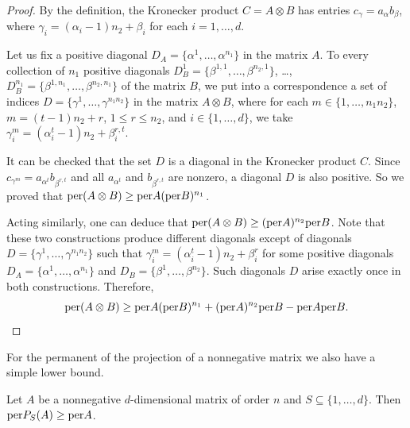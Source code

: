 \documentclass[a4paper]{article}
\begin{document}
\begin{proof}
By the definition, the Kronecker product $C = A \otimes B$ has entries $c_{\gamma} = a_{\alpha} b_{\beta}$, where $\gamma_i = (\alpha_i -1)n_2 + \beta_i$ for each $i = 1, \ldots, d$.  

Let  us fix a positive diagonal $D_A = \{ \alpha^1, \ldots, \alpha^{n_1}\}$ in the matrix $A$. To every collection of $n_1$ positive diagonals $D^1_B = \{ \beta^{1,1},\ldots,  \beta^{n_2,1} \}$, \ldots, $D^{n_1}_B = \{ \beta^{1,n_1}, \ldots, \beta^{n_2,n_1} \}$ of the matrix $B$,  we put into a correspondence a set of indices $D = \{ \gamma^1, \ldots, \gamma^{n_1 n_2} \}$ in the matrix $A \otimes B$, where for each $m \in \{ 1, \ldots, n_1n_2\}$, $m = (t- 1) n_2 + r$, $1 \leq r \leq n_2$, and $i \in \{ 1, \ldots, d\} $, we take  $\gamma^m_i = (\alpha^{t}_i -1)n_2 + \beta^{r,t}_i $.

It can be checked that the set $D$ is a diagonal in the Kronecker product $C$.
Since  $c_{\gamma^m} = a_{\alpha^t} b_{\beta^{r,t}}$ and all $a_{\alpha^t}$ and $b_{\beta^{r,t}}$ are nonzero, a diagonal $D$ is also positive. So we proved that ${\rm per} (A \otimes B) \geq {\rm per} A ({\rm per} B)^{n_1}$.

Acting similarly, one can deduce that ${\rm per} (A \otimes B) \geq ({\rm per} A)^{n_2} {\rm per} B$. Note that  these two constructions produce different diagonals except of diagonals $D = \{ \gamma^1, \ldots, \gamma^{n_1 n_2} \}$ such that  $\gamma^m_i = (\alpha^{t}_i -1)n_2 + \beta^{r}_i $ for some positive diagonals $D_A = \{ \alpha^1, \ldots, \alpha^{n_1}\}$  and $D_B = \{ \beta^{1},  \ldots, \beta^{n_2} \}$. Such diagonals $D$   arise exactly once  in both constructions. Therefore, 
$${\rm per} (A \otimes B) \geq  {\rm per} A ({\rm per} B)^{n_1} +  ({\rm per} A)^{n_2} {\rm per} B - {\rm per} A {\rm per} B.$$
\end{proof}


For  the permanent of the projection of a nonnegative matrix we also have a simple lower bound.


\begin{teorema}
Let $A$ be a nonnegative $d$-dimensional matrix of order $n$ and $S \subseteq \{1, \ldots, d \}$. Then ${\rm per} P_S(A) \geq {\rm per} A$.
\end{teorema}
\end{document}
